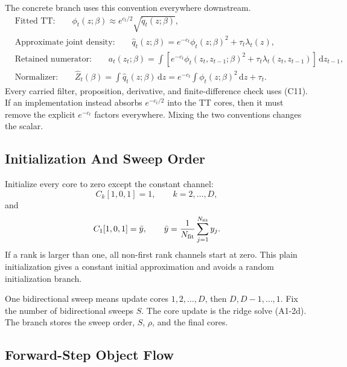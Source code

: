 \documentclass[11pt]{article}
\newcommand{\dd}{\,\mathrm d}
\begin{document}
The concrete branch uses this convention everywhere downstream.
\[
\boxed{
\begin{aligned}
&\text{Fitted TT:}\qquad
  \phi_t(z;\beta)\approx e^{c_t/2}\sqrt{\widetilde q_t(z;\beta)},\\
&\text{Approximate joint density:}\qquad
  \widehat q_t(z;\beta)
  =
  e^{-c_t}\phi_t(z;\beta)^2+\tau_t\lambda_t(z),\\
&\text{Retained numerator:}\qquad
  a_t(z_t;\beta)
  =
  \int
  \left[e^{-c_t}\phi_t(z_t,z_{t-1};\beta)^2
        +\tau_t\lambda_t(z_t,z_{t-1})\right]\dd z_{t-1},\\
&\text{Normalizer:}\qquad
  \widehat Z_t(\beta)
  =
  \int \widehat q_t(z;\beta)\dd z
  =
  e^{-c_t}\int\phi_t(z;\beta)^2\dd z+\tau_t.
\end{aligned}}
\tag{C11}
\]
Every carried filter, proposition, derivative, and finite-difference check uses
(C11).  If an implementation instead absorbs \(e^{-c_t/2}\) into the TT cores,
then it must remove the explicit \(e^{-c_t}\) factors everywhere.  Mixing the
two conventions changes the scalar.

\subsection{Initialization And Sweep Order}

Initialize every core to zero except the constant channel:
\[
    C_k[1,0,1]=1,\qquad k=2,\ldots,D,
\]
and
\[
    C_1[1,0,1]=\bar y,\qquad
    \bar y=\frac1{N_{\rm fit}}\sum_{j=1}^{N_{\rm fit}}y_j.
\]
If a rank is larger than one, all non-first rank channels start at zero.  This
plain initialization gives a constant initial approximation and avoids a random
initialization branch.

One bidirectional sweep means update cores \(1,2,\ldots,D\), then
\(D,D-1,\ldots,1\).  Fix the number of bidirectional sweeps \(S\).  The core
update is the ridge solve (A1-2d).  The branch stores the sweep order, \(S\),
\(\rho\), and the final cores.

\subsection{Forward-Step Object Flow}
\end{document}
